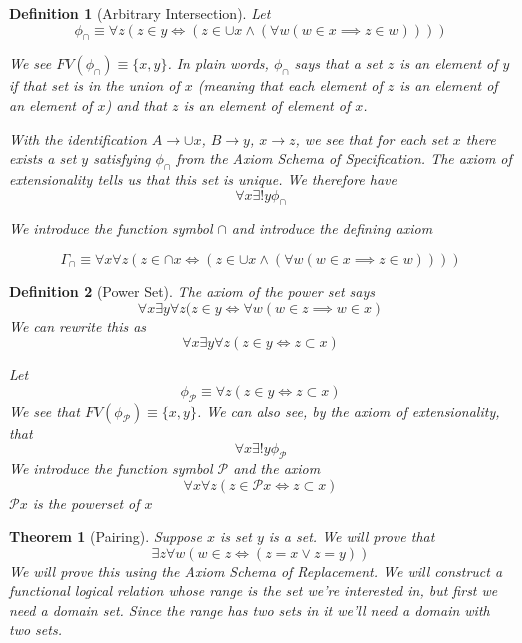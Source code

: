\documentclass[12pt]{article}
\theoremstyle{break}
\newtheorem{definition}{Definition}[section]
\theoremstyle{break}
\newtheorem{theorem}{Theorem}[section]
\theoremstyle{break}
\theoremstyle{break}
\theoremstyle{break}
\newtheorem{informal definition}[definition]{Informal Definition}
\begin{document}
\begin{definition}[Arbitrary Intersection]
Let
$$
\phi_{\cap} \equiv \forall z(z\in y \iff (z\in \cup x \land (\forall w (w\in x \implies z\in w))))
$$

We see $FV(\phi_{\cap}) \equiv \{x, y\}$.
In plain words, $\phi_{\cap}$ says that a set $z$ is an element of $y$ if that set is in the union of $x$ (meaning that each element of $z$ is an element of an element of $x$) and that $z$ is an element of element of $x$.

With the identification $A \to \cup x$, $B\to y$, $x\to z$, we see that for each set $x$ there exists a set $y$ satisfying $\phi_{\cap}$ from the Axiom Schema of Specification.
The axiom of extensionality tells us that this set is unique.
We therefore have
$$
\forall x \exists!y \phi_{\cap}
$$

We introduce the function symbol $\cap$ and introduce the defining axiom

$$
\Gamma_{\cap} \equiv \forall x \forall z(z\in \cap x \iff (z\in \cup x \land(\forall w(w\in x \implies z \in w))))
$$

\end{definition}

\begin{definition}[Power Set]
The axiom of the power set says
$$
\forall x \exists y \forall z(z\in y \iff \forall w (w\in z \implies w\in x)
$$
We can rewrite this as
$$
\forall x \exists y \forall z(z\in y \iff z \subset x)
$$

Let
$$
\phi_{\mathcal{P}} \equiv \forall z (z\in y \iff z \subset x)
$$
We see that $FV(\phi_{\mathcal{P}}) \equiv \{x, y\}$.
We can also see, by the axiom of extensionality, that
$$
\forall x \exists! y \phi_{\mathcal{P}}
$$
We introduce the function symbol $\mathcal{P}$ and the axiom
$$
\forall x \forall z (z \in \mathcal{P}x \iff z \subset x)
$$
$\mathcal{P}x$ is the powerset of $x$
\end{definition}

\begin{theorem}[Pairing]
Suppose $x$ is set $y$ is a set.
We will prove that
$$
\exists z \forall w(w\in z \iff (z = x \lor z = y))
$$
We will prove this using the Axiom Schema of Replacement.
We will construct a functional logical relation whose range is the set we're interested in, but first we need a domain set.
Since the range has two sets in it we'll need a domain with two sets.

\end{theorem}
\end{document}
